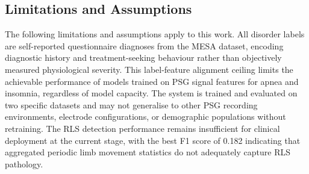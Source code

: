 \subsection{Limitations and Assumptions}

The following limitations and assumptions apply to this work. All disorder labels are self-reported questionnaire diagnoses from the MESA dataset, encoding diagnostic history and treatment-seeking behaviour rather than objectively measured physiological severity. This label-feature alignment ceiling limits the achievable performance of models trained on PSG signal features for apnea and insomnia, regardless of model capacity. The system is trained and evaluated on two specific datasets and may not generalise to other PSG recording environments, electrode configurations, or demographic populations without retraining. The RLS detection performance remains insufficient for clinical deployment at the current stage, with the best F1 score of 0.182 indicating that aggregated periodic limb movement statistics do not adequately capture RLS pathology.
